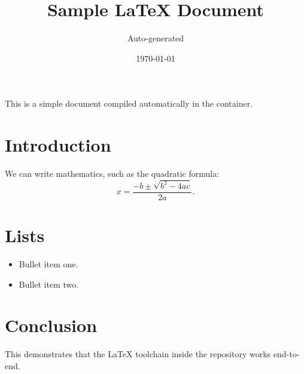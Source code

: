 \documentclass[11pt]{article}
\title{Sample \LaTeX{} Document}
\author{Auto-generated}
\date{\today}
\begin{document}
\maketitle

This is a simple document compiled automatically in the container.

\section{Introduction}
We can write mathematics, such as the quadratic formula:
\begin{equation}
x = \frac{-b \pm \sqrt{b^2 - 4ac}}{2a}.
\end{equation}

\section{Lists}
\begin{itemize}
    \item Bullet item one.
    \item Bullet item two.
\end{itemize}

\section{Conclusion}
This demonstrates that the LaTeX toolchain inside the repository works end-to-end.
\end{document}
